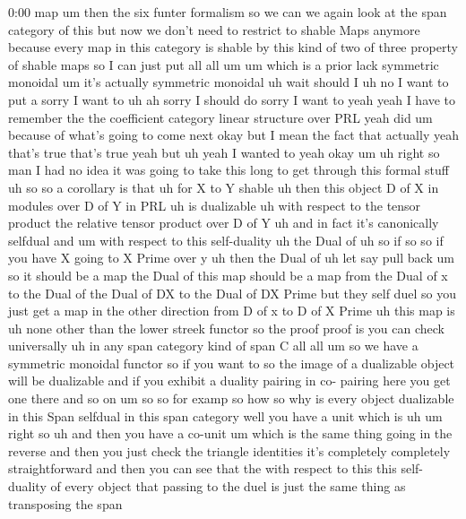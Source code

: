 \begin{unfinished}{0:00}
map
um
then  the  six  funter
formalism  so  we  can  we  again  look  at  the
span  category  of  this  but  now  we  don't
need  to  restrict  to  shable  Maps  anymore
because  every  map  in  this  category  is
shable  by  this  kind  of  two  of  three
property  of  shable  maps  so  I  can  just
put  all
all
um  um  which  is  a  prior  lack  symmetric
monoidal  um  it's  actually  symmetric
monoidal  uh  wait  should  I  uh  no  I  want
to  put  a  sorry  I  want  to  uh  ah  sorry  I
should  do  sorry  I  want  to
yeah  yeah  I  have  to  remember  the  the
coefficient  category  linear  structure
over  PRL  yeah
did  um  because  of  what's  going  to  come
next  okay  but  I  mean  the  fact  that
actually  yeah  that's  true  that's  true
yeah  but  uh  yeah  I  wanted  to
yeah
okay
um  uh  right
so  man  I  had  no  idea  it  was  going  to
take  this  long  to  get  through  this
formal  stuff  uh
so  so  a
corollary  is  that  uh  for
X  to  Y
shable  uh  then  this  object  D  of  X  in
modules  over  D  of  Y  in  PRL  uh  is
dualizable  uh  with  respect  to  the  tensor
product  the  relative  tensor  product  over
D  of  Y  uh  and  in
fact  it's  canonically
selfdual
and
um  with  respect  to
this
self-duality  uh  the
Dual  of  uh  so  if  so  so  if  you  have  X
going  to  X  Prime  over
y  uh  then  the
Dual  of  uh  let  say  pull
back  um  so  it  should  be  a  map  the  Dual
of  this  map  should  be  a  map  from  the
Dual  of  x  to  the  Dual  of  the  Dual  of  DX
to  the  Dual  of  DX  Prime  but  they  self
duel  so  you  just  get  a  map  in  the  other
direction  from  D  of  x  to  D  of  X
Prime
uh  this  map  is  uh  none  other  than  the
lower  streek
functor
so  the  proof  proof
is  you  can  check
universally  uh  in  any  span
category  kind  of  span  C  all
all
um  so  we  have  a  symmetric  monoidal
functor  so  if  you  want
to  so  the  image  of  a  dualizable  object
will  be  dualizable  and  if  you  exhibit  a
duality  pairing  in  co-  pairing  here  you
get  one  there  and  so
on  um  so  so  for  examp  so  how  so  why  is
every  object  dualizable  in  this  Span
selfdual  in  this  span  category  well  you
have  a
unit  which
is
uh
um  right
so
uh  and  then  you  have  a
co-unit  um  which  is  the  same  thing  going
in  the
reverse  and  then  you  just  check  the
triangle  identities  it's
completely  completely
straightforward  and  then  you  can  see
that  the  with  respect  to  this  this
self-duality  of  every  object  that
passing  to  the  duel  is  just  the  same
thing  as  transposing  the  span

\end{unfinished}
